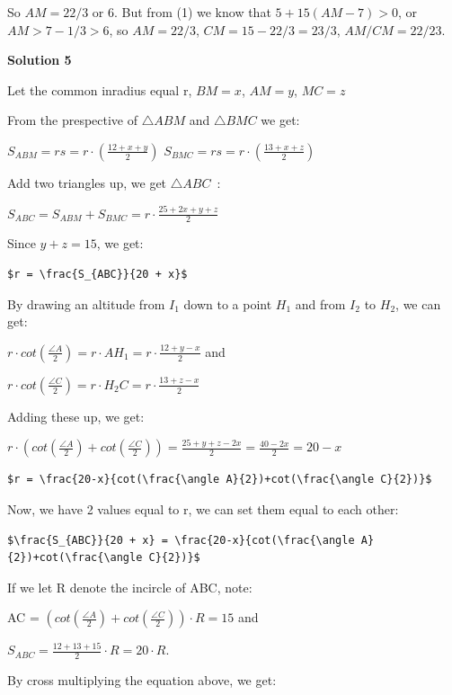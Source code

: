 \begin{enumerate}
 So $AM=22/3$ or $6$. But from (1) we know that $5+15(AM-7)>0$, or $AM>7-1/3>6$, so $AM=22/3$, $CM=15-22/3=23/3$, $AM/CM=22/23$.

 



\textbf{Solution 5}

Let the common inradius equal r, $BM = x$, $AM = y$, $MC = z$

 From the prespective of $\triangle{ABM}$ and $\triangle{BMC}$ we get:

 $S_{ABM} = rs = r \cdot (\frac{12+x+y}{2})$ $S_{BMC} = rs = r \cdot (\frac{13+x+z}{2})$

 Add two triangles up, we get $\triangle{ABC}$ :

 $S_{ABC} =  S_{ABM} +  S_{BMC} = r \cdot \frac{25+2x+y+z}{2}$

 Since $y + z = 15$, we get:

 \begin{verbatim}
$r = \frac{S_{ABC}}{20 + x}$
\end{verbatim}

By drawing an altitude from $I_1$ down to a point $H_1$ and from $I_2$ to $H_2$, we can get:

 $r \cdot cot(\frac{\angle A}{2}) =r \cdot A H_1 = r \cdot \frac{12+y-x}{2}$  and

 $r \cdot cot(\frac{\angle C}{2}) = r \cdot H_2 C =  r \cdot \frac{13+z-x}{2}$

 Adding these up, we get:

 $r \cdot (cot(\frac{\angle A}{2})+cot(\frac{\angle C}{2})) = \frac{25+y+z-2x}{2} = \frac{40-2x}{2} = 20-x$
\begin{verbatim}
$r = \frac{20-x}{cot(\frac{\angle A}{2})+cot(\frac{\angle C}{2})}$
\end{verbatim}

Now, we have 2 values equal to r, we can set them equal to each other:

 \begin{verbatim}
$\frac{S_{ABC}}{20 + x} = \frac{20-x}{cot(\frac{\angle A}{2})+cot(\frac{\angle C}{2})}$ 
\end{verbatim}

If we let R denote the incircle of ABC, note:

 AC = $(cot(\frac{\angle A}{2})+cot(\frac{\angle C}{2})) \cdot R = 15$ and

 $S_{ABC} = \frac{12+13+15}{2} \cdot R = 20 \cdot R$. 

 By cross multiplying the equation above, we get:


\end{enumerate}
